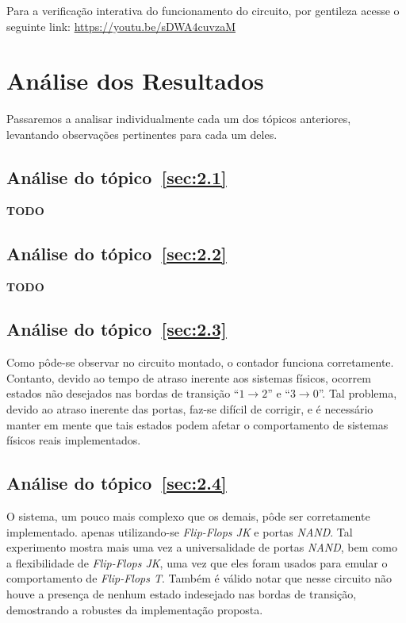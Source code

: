 \documentclass[12pt]{article}
\begin{document}
Para a verificação interativa do funcionamento do circuito, por gentileza acesse
o seguinte link:
\href{https://youtu.be/sDWA4cuvzaM}{https://youtu.be/sDWA4cuvzaM}

\section{Análise dos Resultados}\label{sec:resultados}

Passaremos a analisar individualmente cada um dos tópicos anteriores, levantando
observações pertinentes para cada um deles.

\subsection{Análise do tópico~\ref{sec:2.1}}\label{sec:analise2.1}

\textbf{TODO}

\subsection{Análise do tópico~\ref{sec:2.2}}\label{sec:analise2.2}

\textbf{TODO}

\subsection{Análise do tópico~\ref{sec:2.3}}\label{sec:analise2.3}

Como pôde-se observar no circuito montado, o contador funciona corretamente.
Contanto, devido ao tempo de atraso inerente aos sistemas físicos, ocorrem
estados não desejados nas bordas de transição ``$1 \rightarrow 2$'' e
``$3 \rightarrow 0$''. Tal problema, devido ao atraso inerente das portas,
faz-se difícil de corrigir, e é necessário manter em mente que tais estados
podem afetar o comportamento de sistemas físicos reais implementados.

\subsection{Análise do tópico~\ref{sec:2.4}}\label{sec:analise2.4}

O sistema, um pouco mais complexo que os demais, pôde ser corretamente
implementado. apenas utilizando-se \emph{Flip-Flops JK} e portas \emph{NAND}.
Tal experimento mostra mais uma vez a universalidade de portas \emph{NAND}, bem
como a flexibilidade de \emph{Flip-Flops JK}, uma vez que eles foram usados para
emular o comportamento de \emph{Flip-Flops T}. Também é válido notar que nesse
circuito não houve a presença de nenhum estado indesejado nas bordas de
transição, demostrando a robustes da implementação proposta.
\end{document}
